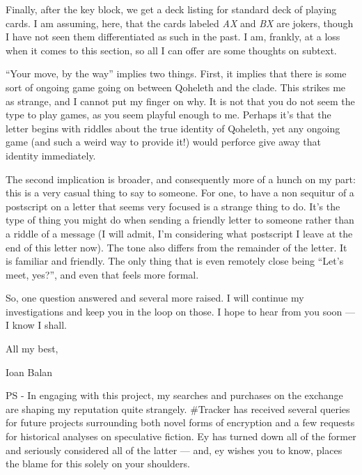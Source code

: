 Finally, after the key block, we get a deck listing for standard deck of playing cards. I am assuming, here, that the cards labeled \emph{AX} and \emph{BX} are jokers, though I have not seen them differentiated as such in the past. I am, frankly, at a loss when it comes to this section, so all I can offer are some thoughts on subtext.

``Your move, by the way'' implies two things. First, it implies that there is some sort of ongoing game going on between Qoheleth and the clade. This strikes me as strange, and I cannot put my finger on why. It is not that you do not seem the type to play games, as you seem playful enough to me. Perhaps it's that the letter begins with riddles about the true identity of Qoheleth, yet any ongoing game (and such a weird way to provide it!) would perforce give away that identity immediately.

The second implication is broader, and consequently more of a hunch on my part: this is a very casual thing to say to someone. For one, to have a non sequitur of a postscript on a letter that seems very focused is a strange thing to do. It's the type of thing you might do when sending a friendly letter to someone rather than a riddle of a message (I will admit, I'm considering what postscript I leave at the end of this letter now). The tone also differs from the remainder of the letter. It is familiar and friendly. The only thing that is even remotely close being ``Let's meet, yes?'', and even that feels more formal.

So, one question answered and several more raised. I will continue my investigations and keep you in the loop on those. I hope to hear from you soon --- I know I shall.

All my best,

Ioan Balan

PS - In engaging with this project, my searches and purchases on the exchange are shaping my reputation quite strangely. \#Tracker has received several queries for future projects surrounding both novel forms of encryption and a few requests for historical analyses on speculative fiction. Ey has turned down all of the former and seriously considered all of the latter --- and, ey wishes you to know, places the blame for this solely on your shoulders.
